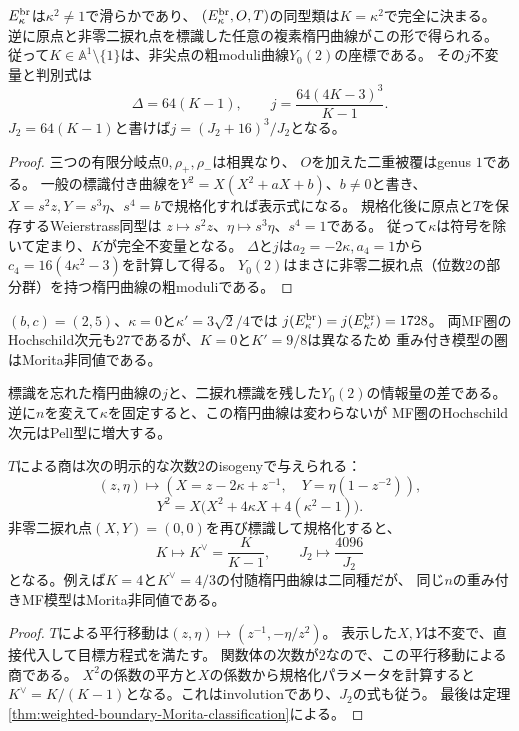 \begin{proposition}[解析modulusは二捩れ付き楕円modulusとなる]
\label{prop:boundary-elliptic-level-two}
$E^{\rm br}_\kappa$は$\kappa^2\ne1$で滑らかであり、
$(E^{\rm br}_\kappa,O,T)$の同型類は$K=\kappa^2$で完全に決まる。
逆に原点と非零二捩れ点を標識した任意の複素楕円曲線がこの形で得られる。
従って$K\in\mathbb A^1\setminus\{1\}$は、非尖点の粗moduli曲線$Y_0(2)$の座標である。
その$j$不変量と判別式は
\begin{equation}\label{eq:boundary-elliptic-j}
 \Delta=64(K-1),\qquad
 \boxed{j=\frac{64(4K-3)^3}{K-1}}.
\end{equation}
$J_2=64(K-1)$と書けば$j=(J_2+16)^3/J_2$となる。
\end{proposition}
\begin{proof}
三つの有限分岐点$0,\rho_+,\rho_-$は相異なり、
$O$を加えた二重被覆はgenus $1$である。
一般の標識付き曲線を$Y^2=X(X^2+aX+b)$、$b\ne0$と書き、
$X=s^2z,Y=s^3\eta$、$s^4=b$で規格化すれば表示式になる。
規格化後に原点と$T$を保存するWeierstrass同型は
$z\mapsto s^2z$、$\eta\mapsto s^3\eta$、$s^4=1$である。
従って$\kappa$は符号を除いて定まり、$K$が完全不変量となる。
$\Delta$と$j$は$a_2=-2\kappa,a_4=1$から
$c_4=16(4\kappa^2-3)$を計算して得る。
$Y_0(2)$はまさに非零二捩れ点（位数2の部分群）を持つ楕円曲線の粗moduliである。
\end{proof}

\begin{corollary}[$j$だけでは圏を区別できない]
$(b,c)=(2,5)$、$\kappa=0$と$\kappa'=3\sqrt2/4$では
$j(E^{\rm br}_\kappa)=j(E^{\rm br}_{\kappa'})=1728$。
両MF圏のHochschild次元も$27$であるが、$K=0$と$K'=9/8$は異なるため
重み付き模型の圏はMorita非同値である。
\end{corollary}
標識を忘れた楕円曲線の$j$と、二捩れ標識を残した$Y_0(2)$の情報量の差である。
逆に$n$を変えて$\kappa$を固定すると、この楕円曲線は変わらないが
MF圏のHochschild次元はPell型に増大する。

\begin{proposition}[二同種写像はMF同値を意味しない]
\label{prop:boundary-two-isogeny}
$T$による商は次の明示的な次数2のisogenyで与えられる：
\[
 (z,\eta)\longmapsto
 \left(X=z-2\kappa+z^{-1},\quad Y=\eta(1-z^{-2})\right),
\]
\[
 Y^2=X\bigl(X^2+4\kappa X+4(\kappa^2-1)\bigr).
\]
非零二捩れ点$(X,Y)=(0,0)$を再び標識して規格化すると、
\[
 K\longmapsto K^\vee=\frac K{K-1},\qquad
 J_2\longmapsto\frac{4096}{J_2}
\]
となる。例えば$K=4$と$K^\vee=4/3$の付随楕円曲線は二同種だが、
同じ$n$の重み付きMF模型はMorita非同値である。
\end{proposition}
\begin{proof}
$T$による平行移動は$(z,\eta)\mapsto(z^{-1},-\eta/z^2)$。
表示した$X,Y$は不変で、直接代入して目標方程式を満たす。
関数体の次数が2なので、この平行移動による商である。
$X^2$の係数の平方と$X$の係数から規格化パラメータを計算すると
$K^\vee=K/(K-1)$となる。これはinvolutionであり、$J_2$の式も従う。
最後は定理\ref{thm:weighted-boundary-Morita-classification}による。
\end{proof}

